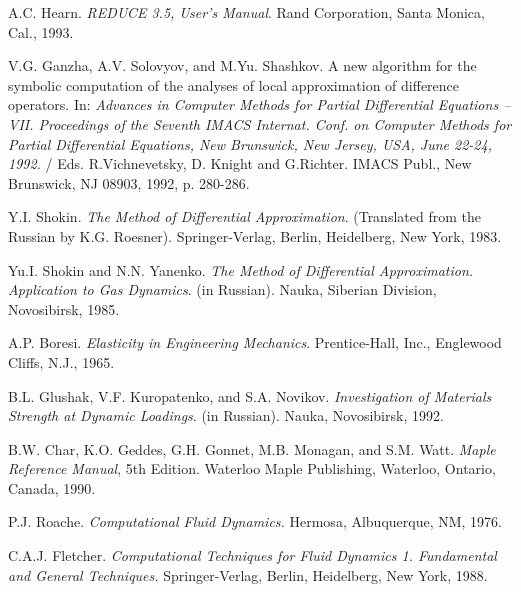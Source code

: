 \begin{description}
A.C. Hearn. {\em REDUCE 3.5, User's Manual}. Rand Corporation, Santa Monica,
Cal., 1993.
\item[ 9.]
V.G. Ganzha, A.V. Solovyov, and M.Yu. Shashkov. A new algorithm for the
symbolic computation of the analyses of local approximation of difference
operators. In: {\em Advances in Computer Methods for Partial Differential
Equations -- VII. Proceedings of the Seventh IMACS Internat. Conf. on Computer
Methods for Partial Differential Equations, New Brunswick, New Jersey, USA,
June 22-24, 1992.} / Eds. R.Vichnevetsky, D. Knight and G.Richter. IMACS
Publ., New Brunswick, NJ 08903, 1992, p. 280-286.
\item[10.]
Y.I. Shokin. {\em The Method of Differential Approximation}. (Translated
from the Russian by K.G. Roesner). Springer-Verlag, Berlin, Heidelberg,
New York, 1983.
\item[11.]
Yu.I. Shokin and N.N. Yanenko. {\em The Method of Differential Approximation.
Application to Gas Dynamics}. (in Russian). Nauka, Siberian Division,
Novosibirsk, 1985.
\item[12.]
A.P. Boresi. {\em Elasticity in Engineering Mechanics}. Prentice-Hall, Inc.,
Englewood Cliffs, N.J., 1965.
\item[13.]
B.L. Glushak, V.F. Kuropatenko, and S.A. Novikov. {\em Investigation of
Materials Strength at Dynamic Loadings}. (in Russian). Nauka, Novosibirsk,
1992.
\item[14.]
B.W. Char, K.O. Geddes, G.H. Gonnet, M.B. Monagan, and S.M. Watt. {\em Maple
Reference Manual}, 5th Edition. Waterloo Maple Publishing, Waterloo, Ontario,
Canada, 1990.
\item[15.]
P.J. Roache. {\em Computational Fluid Dynamics.} Hermosa, Albuquerque, NM,
1976.
\item[16.]
C.A.J. Fletcher. {\em Computational Techniques for Fluid Dynamics 1.
Fundamental and General Techniques.} Springer-Verlag, Berlin, Heidelberg,
New York, 1988.
\end{description}
